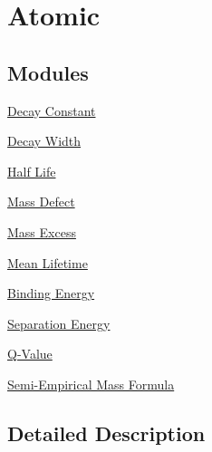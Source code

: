 \hypertarget{group___e_g_x_phys-_atomic}{}\section{Atomic}
\label{group___e_g_x_phys-_atomic}
\subsection*{Modules}
\begin{DoxyCompactItemize}
\item 
\hyperlink{group___e_g_x_phys-_decay_constant}{Decay Constant}
\item 
\hyperlink{group___e_g_x_phys-_decay_width}{Decay Width}
\item 
\hyperlink{group___e_g_x_phys-_half_life}{Half Life}
\item 
\hyperlink{group___e_g_x_phys-_mass_defect}{Mass Defect}
\item 
\hyperlink{group___e_g_x_phys-_mass_excess}{Mass Excess}
\item 
\hyperlink{group___e_g_x_phys-_mean_lifetime}{Mean Lifetime}
\item 
\hyperlink{group___e_g_x_phys-_nuclear_binding_energy}{Binding Energy}
\item 
\hyperlink{group___e_g_x_phys-_nuclear_separation_energy}{Separation Energy}
\item 
\hyperlink{group___e_g_x_phys-_q_value}{Q-\/\+Value}
\item 
\hyperlink{group___e_g_x_phys-_semi_empirical_mass_formula}{Semi-\/\+Empirical Mass Formula}
\end{DoxyCompactItemize}


\subsection{Detailed Description}
